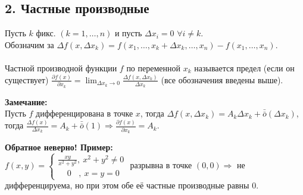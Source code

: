 \documentclass[book, 11pt]{report}
\begin{document}
        \subsection*{2. Частные производные}
        \par{Пусть $k$ фикс. $(k=1,\ldots,n)$ и пусть $\Delta x_i=0$ $\forall i\ne k$. \\
        Обозначим за $\Delta f(x, \Delta x_k)=f(x_1, \ldots,x_k+\Delta x_k,\ldots,x_n)-f(x_1,\ldots,x_n)$.\\ \\
        Частной производной функции $f$ по переменной $x_k$ называется предел (если он существует) $\displaystyle\frac{\partial f(x)}{\partial x_k}=\lim_{\Delta x_k\to0}\frac{\Delta f(x,\Delta x_k)}{\Delta x_k}$ (все обозначения введены выше).
        }
        \vspace{0.6cm}
        \par{\textbf{Замечание:}\\
        Пусть $f$ дифференцирована в точке $x$, тогда $\Delta f(x,\Delta x_k)=A_k\Delta x_k+\bar{\bar{o}}(\Delta x_k)$, тогда $\frac{\Delta f(x)}{\Delta x_k}=A_k+\bar{\bar{o}}(1)\Rightarrow\frac{\partial f(x)}{\partial x_k}=A_k$.
        }
        \setcounter{equation}{0}
        \vspace{0.2cm}
        \par{\textbf{Обратное неверно! Пример:}\\
        $f(x,y)=\begin{cases}
                \displaystyle\frac{xy}{x^2+y^2}, \ x^2+y^2\ne0 \\
                \ \ \ \ \ 0 \ \ \ \ , \ x=y=0
            \end{cases}$ разрывна в точке $(0,0)\Rightarrow$ не дифференцируема, но при этом обе её частные производные равны 0.}
        \vspace{0.8cm}
\end{document}
